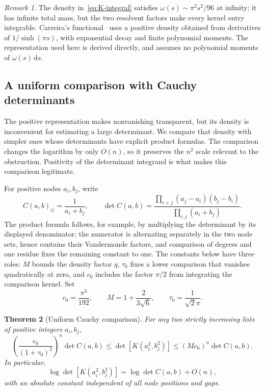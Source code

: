 \documentclass[11pt]{article}
\newtheorem{theorem}{Theorem}[section]
\theoremstyle{definition}
\theoremstyle{remark}
\newtheorem{remark}[theorem]{Remark}
\numberwithin{equation}{section}
\newcommand{\dd}{\,\mathrm d}
\begin{document}
\begin{remark}
The density in~\eqref{eq:K-integral} satisfies
$\omega(s)\sim\pi^2s^2/96$ at infinity; it has infinite total mass,
but the two resolvent factors make every kernel entry integrable.
Carreira's functional~\cite[Definition~24(B) and Lemma~25]{Carreira}
uses a positive density obtained from derivatives of $1/\sinh(\pi s)$,
with exponential decay and finite polynomial moments. The representation
used here is derived directly, and assumes no polynomial moments of
$\omega(s)\dd s$.
\end{remark}

\subsection{A uniform comparison with Cauchy determinants}

The positive representation makes nonvanishing transparent, but its
density is inconvenient for estimating a large determinant. We compare
that density with simpler ones whose determinants have explicit product
formulas. The comparison changes the logarithm by only $O(n)$, so it
preserves the $n^2$ scale relevant to the obstruction. Positivity of the
determinant integrand is what makes this comparison legitimate.

For positive nodes $a_i,b_j$, write
\begin{equation}\label{eq:Cauchy}
 C(a,b)_{ij}=\frac1{a_i+b_j},\qquad
 \det C(a,b)=
 \frac{\prod_{i<j}(a_j-a_i)(b_j-b_i)}{\prod_{i,j}(a_i+b_j)}.
\end{equation}
The product formula follows, for example, by multiplying the determinant
by its displayed denominator: the numerator is alternating separately in
the two node sets, hence contains their Vandermonde factors, and comparison
of degrees and one residue fixes the remaining constant to one.
The constants below have three roles: $M$ bounds the density factor
$q$, $\tau_0$ fixes a lower comparison that vanishes quadratically at
zero, and $c_0$ includes the factor $\pi/2$ from integrating the
comparison kernel. Set
\begin{equation}\label{eq:constants}
 c_0=\frac{\pi^3}{192},\qquad M=1+\frac{2}{3\sqrt6},\qquad
 \tau_0=\frac1{\sqrt2\pi}.
\end{equation}

\begin{theorem}[Uniform Cauchy comparison]\label{thm:comparison}
For any two strictly increasing lists of positive integers $a_i,b_j$,
\begin{equation}\label{eq:comparison}
 \left(\frac{c_0}{(1+\tau_0)^2}\right)^n\det C(a,b)
 \leq\det[K(a_i^2,b_j^2)]
 \leq (Mc_0)^n\det C(a,b).
\end{equation}
In particular,
\begin{equation}\label{eq:uniform-log}
 \log\det[K(a_i^2,b_j^2)]=\log\det C(a,b)+O(n),
\end{equation}
with an absolute constant independent of all node positions and gaps.
\end{theorem}
\end{document}
